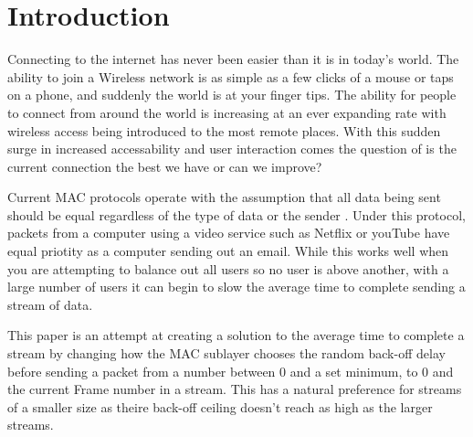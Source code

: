\documentclass{sigcomm-alternate}
\begin{document}
\section{Introduction}
{
Connecting to the internet has never been easier than it is in today's world. The ability to join a Wireless network is as simple as a few clicks of a mouse or taps on a phone, and suddenly the world is at your finger tips. The ability for people to connect from around the world is increasing at an ever expanding rate with wireless access being introduced to the most remote places. With this sudden surge in increased accessability and user interaction comes the question of is the current connection the best we have or can we improve? 

Current MAC protocols operate with the assumption that all data being sent should be equal regardless of the type of data or the sender \cite{5340799, FairScheduling}. Under this protocol, packets from a computer using a video service such as Netflix or youTube have equal priotity as a computer sending out an email. While this works well when you are attempting to balance out all users so no user is above another, with a large number of users it can begin to slow the average time to complete sending a stream of data. 

This paper is an attempt at creating a solution to the average time to complete a stream by changing how the MAC sublayer chooses the random back-off delay before sending a packet from a number between 0 and a set minimum, to 0 and the current Frame number in a stream. This has a natural preference for streams of a smaller size as theire back-off ceiling doesn't reach as high as the larger streams. 
}
\end{document}
